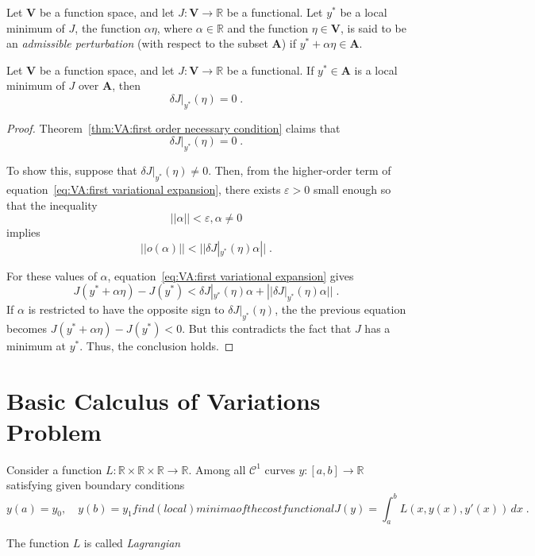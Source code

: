 \begin{definition}
	Let $\mathbf{V}$ be a function space, and let 
	$J:\mathbf{V}\to\mathbb{R}$ be a functional. Let $y^\ast$ be a local
	minimum of $J$, the function $\alpha\eta$, where $\alpha\in\mathbb{R}$
	and the function $\eta\in\mathbf{V}$, is said to be an 
	\emph{admissible perturbation} (with respect to the subset 
	$\mathbf{A}$) if $y^\ast+\alpha\eta\in\mathbf{A}$.
\end{definition}

\begin{theorem}\label{thm:VA:first order necessary condition}
	Let $\mathbf{V}$ be a function space, and let 
	$J:\mathbf{V}\to\mathbb{R}$ be a functional. If $y^\ast\in\mathbf{A}$
	is a local minimum of $J$ over $\mathbf{A}$, then
	\[\delta J|_{y^\ast}(\eta)=0\;.\]
\end{theorem}

\begin{proof}
	Theorem~\ref{thm:VA:first order necessary condition} claims that
	\[\delta J|_{y^\ast}(\eta)=0\;.\]

	To show this, suppose that $\delta J|_{y^\ast}(\eta)\neq0$. Then,
	from the higher-order term of equation~\eqref{eq:VA:first variational expansion},
	there exists $\varepsilon>0$ small enough so that the inequality
	\[||\alpha||<\varepsilon, \alpha\neq0\]
	implies
	\[||o(\alpha)||<||\delta J|_{y^\ast}(\eta)\alpha||\;.\]

	For these values of $\alpha$, equation~\eqref{eq:VA:first variational expansion}
	gives
	\begin{equation*}
		J(y^\ast+\alpha\eta)-J(y^\ast)<\delta J|_{y^\ast}(\eta)\alpha + 
		||\delta J|_{y^\ast}(\eta)\alpha||\;.
	\end{equation*}
	If $\alpha$ is restricted to have the opposite sign to 
	$\delta J|_{y^\ast}(\eta)$, the the previous equation becomes
	$J(y^\ast+\alpha\eta)-J(y^\ast)<0$. But this contradicts the fact
	that $J$ has a minimum at $y^\ast$. Thus, the conclusion holds.
\end{proof}

\section{Basic Calculus of Variations Problem}

Consider a function $L:\mathbb{R}\times\mathbb{R}\times\mathbb{R}\to\mathbb{R}$.
Among all $\mathcal{C}^1$ curves $y:[a,b]\to\mathbb{R}$ satisfying given
boundary conditions
\begin{subequations}
	\begin{equation}
		y(a)=y_0,\quad y(b)=y_1
	\end{equation}
	find (local) minima of the cost functional
	\begin{equation}
		J(y)=\int_a^b L(x, y(x), y'(x))\,dx\;.
	\end{equation}
\end{subequations}

The function $L$ is called \emph{Lagrangian}
